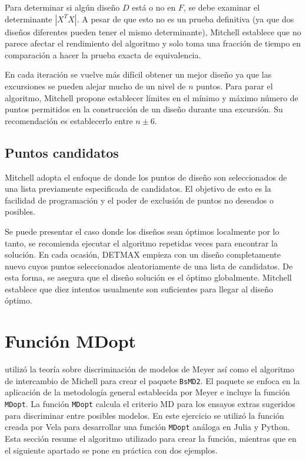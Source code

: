 Para determinar si algún diseño $D$ está o no en $F$, se debe examinar el determinante $|X^{T}X|$. A pesar de que esto no es un prueba definitiva (ya que dos diseños diferentes pueden tener el mismo determinante), Mitchell establece que no parece afectar el rendimiento del algoritmo y solo toma una fracción de tiempo en comparación a hacer la prueba exacta de equivalencia.

En cada iteración se vuelve más difícil obtener un mejor diseño ya que las excursiones se pueden alejar mucho de un nivel de $n$ puntos. Para parar el algoritmo, Mitchell propone establecer límites en el mínimo y máximo número de puntos permitidos en la construcción de un diseño durante una excursión. Su recomendación es establecerlo entre $n \pm 6$. 

\subsection{Puntos candidatos}

Mitchell adopta el enfoque de \cite{dykstra1971augmentation} donde los puntos de diseño son seleccionados de una lista previamente especificada de candidatos. El objetivo de esto es la facilidad de programación y el poder de exclusión de puntos no deseados o posibles. 

Se puede presentar el caso donde los diseños sean óptimos localmente por lo tanto, se recomienda ejecutar el algoritmo repetidas veces para encontrar la solución. En cada ocasión, DETMAX empieza con un diseño completamente nuevo cuyos puntos seleccionados aleatoriamente de una lista de candidatos. De esta forma, se asegura que el diseño solución es el óptimo globalmente. Mitchell establece que diez intentos usualmente son suficientes para llegar al diseño óptimo. 

\section{Función MDopt}
\cite{tesis_paty} utilizó la teoría sobre discriminación de modelos de Meyer así como el algoritmo de intercambio de Michell para crear el paquete \texttt{BsMD2}. El paquete se enfoca en la aplicación de la metodología general establecida por Meyer e incluye la función \texttt{MDopt}. La función \texttt{MDopt} calcula el criterio MD para los ensayos extras sugeridos para discriminar entre posibles modelos. En este ejercicio se utilizó la función creada por Vela para desarrollar una función \texttt{MDopt} análoga en \textsf{Julia} y \textsf{Python}. Esta sección resume el algoritmo utilizado para crear la función, mientras que en el siguiente apartado se pone en práctica con dos ejemplos. 

